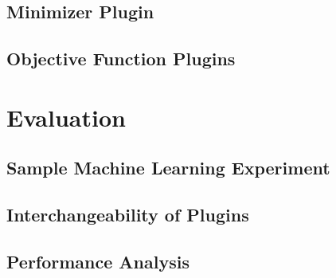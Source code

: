 \documentclass[
  a4paper,  %
  twoside,  %
  bibliography=totoc,
  headsepline,
  cleardoublepage=empty,
  parskip=half,
  draft=false
]{scrbook}
\begin{document}
\section{Minimizer Plugin}
\label{sec:minimizerPlugin}
\section{Objective Function Plugins}
\label{sec:objectiveFunctionPlugins}


\chapter{Evaluation}
\label{chap:evaluation}
\section{Sample Machine Learning Experiment}
\label{sec:sampleMachineLearningExperiment}
\section{Interchangeability of Plugins}
\label{sec:interchangeabilityOfPlugins}
\section{Performance Analysis}
\label{sec:performanceAnalysis}
\end{document}
